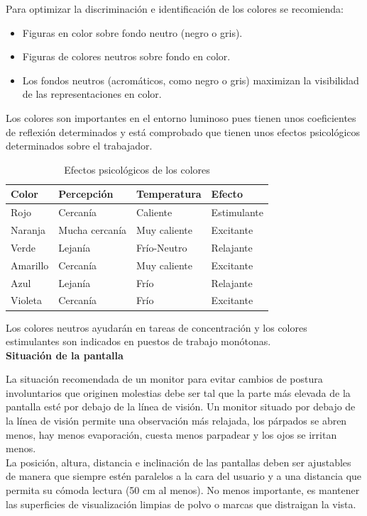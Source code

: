 Para optimizar la discriminación e identificación de los colores se recomienda:
\begin{itemize}
    \item Figuras en color sobre fondo neutro (negro o gris).
    \item Figuras de colores neutros sobre fondo en color.
    \item Los fondos neutros (acromáticos, como negro o gris) maximizan la visibilidad de las representaciones en color.
\end{itemize}

Los colores son importantes en el entorno luminoso pues tienen unos coeficientes de reflexión determinados y está comprobado que tienen unos efectos psicológicos determinados sobre el trabajador.

\begin{table}[H]
  \centering
  \caption{Efectos psicológicos de los colores}
    \begin{tabular}{|l|l|l|l|}
    \hline
    \textbf{Color} & \textbf{Percepción} & \textbf{Temperatura} & \textbf{Efecto} \\
    \hline
    Rojo & Cercanía & Caliente & Estimulante \\
    \hline
    Naranja & Mucha cercanía & Muy caliente & Excitante \\
    \hline
    Verde & Lejanía & Frío-Neutro & Relajante \\
    \hline
    Amarillo & Cercanía & Muy caliente & Excitante \\
    \hline
    Azul & Lejanía & Frío & Relajante \\
    \hline
    Violeta & Cercanía & Frío & Excitante \\
    \hline
    \end{tabular}%
  \label{tab:inter1}%
\end{table}%

Los colores neutros ayudarán en tareas de concentración y los colores estimulantes son indicados en puestos de trabajo monótonas.\\

\textbf{Situación de la pantalla}

La situación recomendada de un monitor para evitar cambios de postura involuntarios que originen molestias debe ser tal que la parte más elevada de la pantalla esté por debajo de la línea de visión. Un monitor situado por debajo de la línea de visión permite una observación más relajada, los párpados se abren menos, hay menos evaporación, cuesta menos parpadear y los ojos se irritan menos.\\
La posición, altura, distancia e inclinación de las pantallas deben ser ajustables de manera que siempre estén paralelos a la cara del usuario y a una distancia que permita su cómoda lectura (50 cm al menos). No menos importante, es mantener las superficies de visualización limpias de polvo o marcas que distraigan la vista.\\

